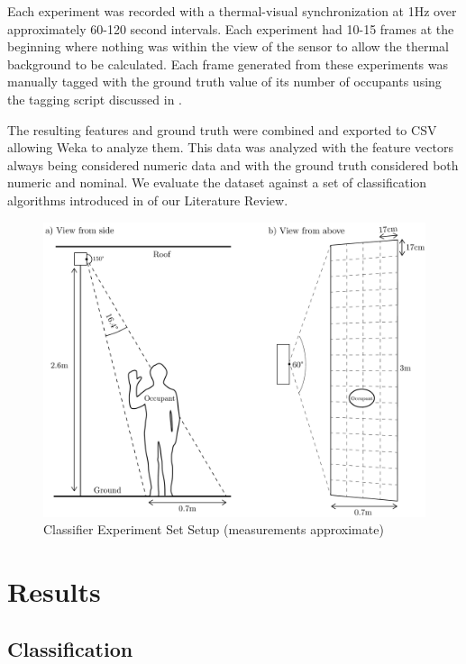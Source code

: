 \documentclass[../thesis/thesis.tex]{subfiles}
\begin{document}
Each experiment was recorded with a thermal-visual synchronization at 1Hz over approximately 60-120 second intervals. Each experiment had 10-15 frames at the beginning where nothing was within the view of the sensor to allow the thermal background to be calculated. Each frame generated from these experiments was manually tagged with the ground truth value of its number of occupants using the tagging script discussed in .

The resulting features and ground truth were combined and exported to CSV allowing Weka to analyze them. This data was analyzed with the feature vectors always being considered numeric data and with the ground truth considered both numeric and nominal. We evaluate the dataset against a set of classification algorithms introduced in  of our Literature Review.

\begin{landscape}
 \begin{figure}
 \centering
 \includegraphics[height=\textheight]{../diagrams/third-exp-setup2.pdf}
 \caption{Classifier Experiment Set Setup (measurements approximate)}
 \label{fig:exps:3setup}
 \end{figure}
\end{landscape}

\section{Results}
\label{sec:results}

\subsection{Classification}
\label{subsec:classification}
\end{document}
